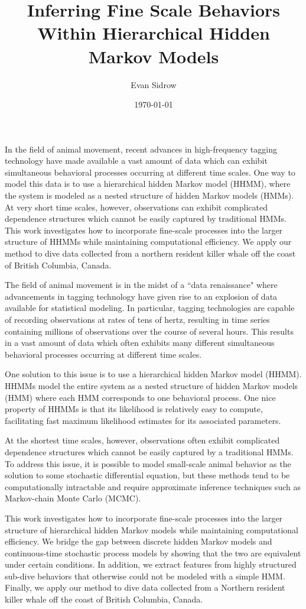 \documentclass[10pt]{article}
\title{Inferring Fine Scale Behaviors Within Hierarchical Hidden Markov Models}
\author{Evan Sidrow}
\date{\today}
\begin{document}
\maketitle

\abstract

In the field of animal movement, recent advances in high-frequency tagging technology have made available a vast amount of data which can exhibit simultaneous behavioral processes occurring at different time scales. One way to model this data is to use a hierarchical hidden Markov model (HHMM), where the system is modeled as a nested structure of hidden Markov models (HMMs). At very short time scales, however, observations can exhibit complicated dependence structures which cannot be easily captured by traditional HMMs. This work investigates how to incorporate fine-scale processes into the larger structure of HHMMs while maintaining computational efficiency. We apply our method to dive data collected from a northern resident killer whale off the coast of British Columbia, Canada.

The field of animal movement is in the midst of a ``data renaissance" where advancements in tagging technology have given rise to an explosion of data available for statistical modeling. In particular, tagging technologies are capable of recording observations at rates of tens of hertz, resulting in time series containing millions of observations over the course of several hours. This results in a vast amount of data which often exhibits many different simultaneous behavioral processes occurring at different time scales. 

One solution to this issue is to use a hierarchical hidden Markov model (HHMM). HHMMs model the entire system as a nested structure of hidden Markov models (HMM) where each HMM corresponds to one behavioral process. One nice property of HHMMs is that its likelihood is relatively easy to compute, facilitating fast maximum likelihood estimates for its associated parameters.  

At the shortest time scales, however, observations often exhibit complicated dependence structures which cannot be easily captured by a traditional HMMs. To address this issue, it is possible to model small-scale animal behavior as the solution to some stochastic differential equation, but these methods tend to be computationally intractable and require approximate inference techniques such as Markov-chain Monte Carlo (MCMC).

This work investigates how to incorporate fine-scale processes into the larger structure of hierarchical hidden Markov models while maintaining computational efficiency. We bridge the gap between discrete hidden Markov models and continuous-time stochastic process models by showing that the two are equivalent under certain conditions. In addition, we extract features from highly structured sub-dive behaviors that otherwise could not be modeled with a simple HMM. Finally, we apply our method to dive data collected from a Northern resident killer whale off the coast of British Columbia, Canada.
\end{document}
